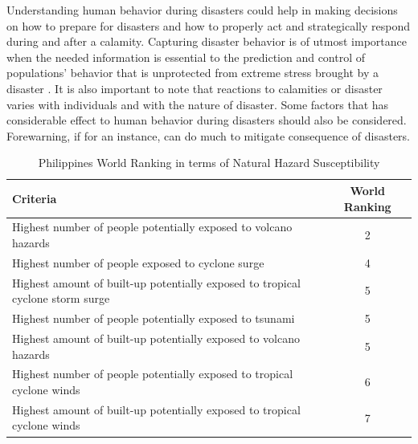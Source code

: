 \documentclass[runningheads]{llncs}
\begin{document}
Understanding human behavior during disasters could help in making decisions on how to prepare for disasters and how to properly act and strategically respond during and after a calamity. Capturing disaster behavior is of utmost importance when the needed information is essential to the prediction and control of populations’ behavior that is unprotected from extreme stress brought by a disaster \cite{fritz1954norc}. It is also important to note that reactions to calamities or disaster varies with individuals and with the nature of disaster. Some factors that has considerable effect to human behavior during disasters should also be considered. Forewarning, if for an instance, can do much to mitigate consequence of disasters.
     
\begin{table}[!htbp]
\centering
\caption{Philippines World Ranking in terms of Natural Hazard Susceptibility \cite{pesaresi2017atlas}}
\label{Table:PhilRanking}
\begin{tabular}{p{4.5cm} c}
\hline
\textbf{Criteria}                                                             & \textbf{World Ranking}  \\ \hline
Highest number of people potentially exposed to volcano hazards                                      & 2                         \\
Highest number of people exposed to cyclone surge                                                           & 4 						\\                                                                                                                                             
Highest amount of built-up potentially exposed to tropical cyclone storm surge					 & 5                         \\
Highest number of people potentially exposed to tsunami												& 5                          \\
Highest amount of built-up potentially exposed to volcano hazards									& 5                          \\
Highest number of people potentially exposed to tropical cyclone winds							& 6                          \\
Highest amount of built-up potentially exposed to tropical cyclone winds							& 7                          \\
\hline
\end{tabular}
\end{table}
\end{document}
